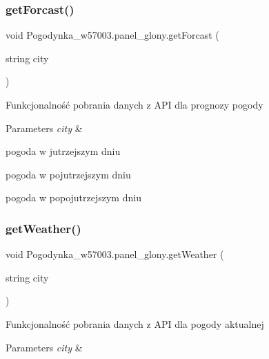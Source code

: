 \subsubsection{\texorpdfstring{get\+Forcast()}{getForcast()}}
{\footnotesize\ttfamily void Pogodynka\+\_\+w57003.\+panel\+\_\+glony.\+get\+Forcast (\begin{DoxyParamCaption}\item[{string}]{city }\end{DoxyParamCaption})\hspace{0.3cm}{\ttfamily [private]}}



Funkcjonalność pobrania danych z A\+PI dla prognozy pogody 


\begin{DoxyParams}{Parameters}
{\em city} & \\
\hline
\end{DoxyParams}
pogoda w jutrzejszym dniu

pogoda w pojutrzejszym dniu

pogoda w popojutrzejszym dniu \mbox{\label{class_pogodynka__w57003_1_1panel__glony_a1b552bb32257c708d4c7755b60cb54a0}} 
\subsubsection{\texorpdfstring{get\+Weather()}{getWeather()}}
{\footnotesize\ttfamily void Pogodynka\+\_\+w57003.\+panel\+\_\+glony.\+get\+Weather (\begin{DoxyParamCaption}\item[{string}]{city }\end{DoxyParamCaption})\hspace{0.3cm}{\ttfamily [private]}}



Funkcjonalność pobrania danych z A\+PI dla pogody aktualnej 


\begin{DoxyParams}{Parameters}
{\em city} & \\
\hline
\end{DoxyParams}
\mbox{\label{class_pogodynka__w57003_1_1panel__glony_a0548ec7f9130fc67e27ad426e0cb79da}} 
